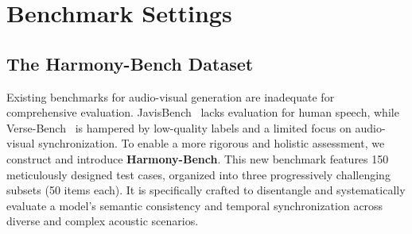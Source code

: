 \section{Benchmark Settings}
\label{sec:benchmark_and_metrics}

\subsection{The Harmony-Bench Dataset}

Existing benchmarks for audio-visual generation are inadequate for comprehensive evaluation. JavisBench~\cite{liu2025javisdit} lacks evaluation for human speech, while Verse-Bench~\cite{wang2025universe} is hampered by low-quality labels and a limited focus on audio-visual synchronization. To enable a more rigorous and holistic assessment, we construct and introduce \textbf{Harmony-Bench}. This new benchmark features 150 meticulously designed test cases, organized into three progressively challenging subsets (50 items each). It is specifically crafted to disentangle and systematically evaluate a model's semantic consistency and temporal synchronization across diverse and complex acoustic scenarios.


